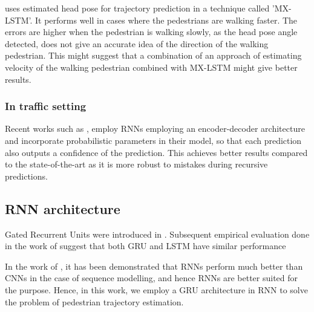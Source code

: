 \cite{hasan_mx-lstm:_2018} uses estimated head pose for trajectory prediction in a technique called 'MX-LSTM'. It performs well in cases where the pedestrians are walking faster. The errors are higher when the pedestrian is walking slowly, as the head pose angle detected, does not give an accurate idea of the direction of the walking pedestrian. This might suggest that a combination of an approach of estimating velocity of the walking pedestrian combined with MX-LSTM might give better results.



\subsubsection{In traffic setting}
Recent works such as \cite{bhattacharyya_long-term_2017}, employ RNNs employing an encoder-decoder architecture and incorporate probabilistic parameters in their model, so that each prediction also outputs a confidence of the prediction. This achieves better results compared to the state-of-the-art as it is more robust to mistakes during recursive predictions.

\subsection{RNN architecture}

Gated Recurrent Units were introduced in \cite{cho_properties_2014}. Subsequent empirical evaluation done in the work of \cite{chung_empirical_2014} suggest that both GRU and LSTM have similar performance

In the work of \cite{yin_comparative_2017}, it has been demonstrated that RNNs perform much better than CNNs in the case of sequence modelling, and hence RNNs are better suited for the purpose. Hence, in this work, we employ a GRU architecture in RNN to solve the problem of pedestrian trajectory estimation.

